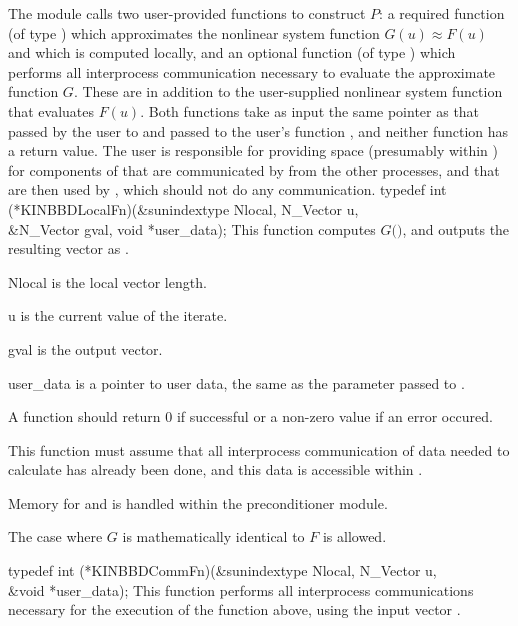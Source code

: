The {\kinbbdpre} module calls two user-provided functions to construct $P$:
a required function  (of type ) which
approximates the nonlinear system function $G(u) \approx F(u)$ and which
is computed locally, and an optional function  (of type )
which performs all interprocess communication necessary to evaluate
the approximate function $G$.
These are in addition to the user-supplied nonlinear system function that
evaluates $F(u)$.
Both functions take as input the same pointer  as that passed
by the user to  and passed to the user's function ,
and neither function has a return value. The user is responsible for
providing space (presumably within ) for components of 
that are communicated by  from the other processes, and that are
then used by , which should not do any communication.
{
  typedef int (*KINBBDLocalFn)(&sunindextype Nlocal, N\_Vector u, \\
                               &N\_Vector gval, void *user\_data);
}
{
  This  function computes $G($$)$, and outputs the resulting
  vector as .
}
{
  \begin{args}
  \item[Nlocal]
    is the local vector length.
  \item[u]
    is the current value of the iterate.
  \item[gval]
    is the output vector.
  \item[user\_data]
    is a pointer to user data, the same as the 
    parameter passed to .
  \end{args}
}
{
  A  function should return 0 if successful or a non-zero
  value if an error occured.
}
{
  This function must assume that all interprocess communication of data needed to
  calculate  has already been done, and this data is accessible within
  .

  Memory for  and  is handled within the preconditioner module.

  The case where $G$ is mathematically identical to $F$ is allowed.
}
{
  typedef int (*KINBBDCommFn)(&sunindextype Nlocal, N\_Vector u, \\
                              &void *user\_data);
}
{
  This  function performs all interprocess communications necessary
  for the execution of the  function above, using the input vector .
}
